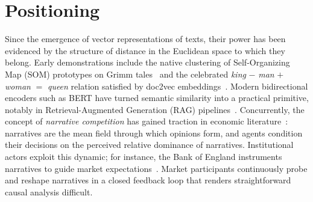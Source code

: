 \documentclass[
  journal=medium,
  manuscript=article-type,
  year=2025,
  volume=1,
]{cup-journal}
\begin{document}

\section{Positioning}
\label{sec:introbis}

Since the emergence of vector representations of texts, their power has been evidenced
by the structure of distance in the Euclidean space to which they belong.
Early demonstrations include the native clustering of Self-Organizing Map (SOM)
prototypes on Grimm tales~\autocite{honkela1995contextual} and the celebrated
\textit{king} $-$ \textit{man} $+$ \textit{woman} $=$ \textit{queen} relation
satisfied by doc2vec embeddings~\autocite{mikolov2013linguistic}.
Modern bidirectional encoders such as BERT have turned semantic similarity into
a practical primitive, notably in Retrieval-Augmented Generation (RAG)
pipelines~\autocite{wang2024utilizing}.
Concurrently, the concept of \emph{narrative competition} has gained traction in
economic literature~\autocite{shiller2020narrative}:
narratives are the mean field through which opinions form,
and agents condition their decisions on the perceived relative dominance of narratives.
Institutional actors exploit this dynamic; for instance, the Bank of England
instruments narratives to guide market expectations~\autocite{naef2024blowing}.
Market participants continuously probe and reshape narratives in a closed feedback loop
that renders straightforward causal analysis difficult.
\end{document}
